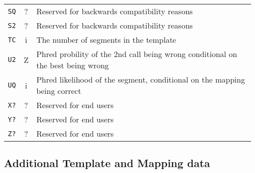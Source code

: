 \documentclass[10pt]{article}
\begin{document}
\begin{center}
\begin{longtable}{ccp{12.5cm}}
  {\tt SQ} & ? & Reserved for backwards compatibility reasons \\
  {\tt S2} & ? & Reserved for backwards compatibility reasons \\
  {\tt TC} & i & The number of segments in the template \\
  {\tt U2} & Z & Phred probility of the 2nd call being wrong conditional on the best being wrong \\
  {\tt UQ} & i & Phred likelihood of the segment, conditional on the mapping being correct \\
  {\tt X?} & ? & Reserved for end users \\
  {\tt Y?} & ? & Reserved for end users \\
  {\tt Z?} & ? & Reserved for end users \\
  \hline
\end{longtable}
\end{center}

\subsection{Additional Template and Mapping data}
\end{document}
